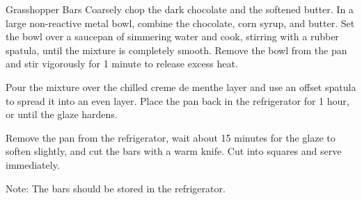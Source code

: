\begin{recipe}{Grasshopper Bars}
  Coarsely chop the dark chocolate and the softened butter. In a large
  non-reactive metal bowl, combine the chocolate, corn syrup, and butter.
  Set the bowl over a saucepan of simmering water and cook, stirring with a
  rubber spatula, until the mixture is completely smooth. Remove the bowl
  from the pan and stir vigorously for 1 minute to release excess heat.

  Pour the mixture over the chilled creme de menthe layer and use an offset
  spatula to spread it into an even layer. Place the pan back in the
  refrigerator for 1 hour, or until the glaze hardens.

  Remove the pan from the refrigerator, wait about 15 minutes for the glaze
  to soften slightly, and cut the bars with a warm knife. Cut into squares
  and serve immediately.

  Note: The bars should be stored in the refrigerator.

\end{recipe}

